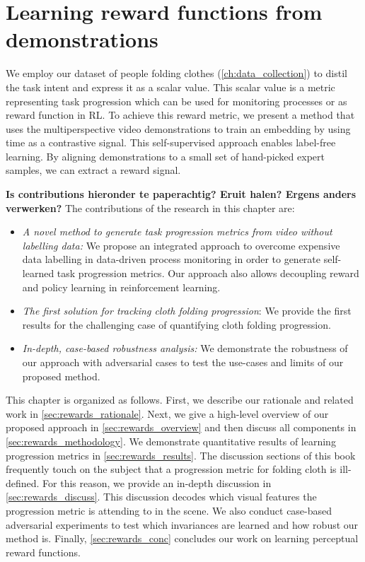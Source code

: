 \documentclass[\home/main.tex]{subfiles}
\begin{document}

\chapter{Learning reward functions from demonstrations}\label{ch:reward_functions}

We employ our dataset of people folding clothes (\cref{ch:data_collection}) to distil the task intent and express it as a scalar value. This scalar value is a metric representing task progression which can be used for monitoring processes or as reward function in \gls{RL}. To achieve this reward metric, we present a method that uses the multiperspective video demonstrations to train an embedding by using time as a contrastive signal. This self-supervised approach enables label-free learning. By aligning demonstrations to a small set of hand-picked expert samples, we can extract a reward signal.

\textbf{Is contributions hieronder te paperachtig? Eruit halen? Ergens anders verwerken?}
The contributions of the research in this chapter are:
\begin{itemize}
    \item \emph{A novel method to generate task progression metrics from video without labelling data:} We propose an integrated approach to overcome expensive data labelling in data-driven process monitoring in order to generate self-learned task progression metrics. Our approach also allows decoupling reward and policy learning in reinforcement learning.
    \item \emph{The first solution for tracking cloth folding progression}: We provide the first results for the challenging case of quantifying cloth folding progression.
    \item \emph{In-depth, case-based robustness analysis:} We demonstrate the robustness of our approach with adversarial cases to test the use-cases and limits of our proposed method.
\end{itemize}

This chapter is organized as follows.
First, we describe our rationale and related work in \cref{sec:rewards_rationale}. Next, we give a high-level overview of our proposed approach in \cref{sec:rewards_overview} and then discuss all components in \cref{sec:rewards_methodology}. We demonstrate quantitative results of learning progression metrics in \cref{sec:rewards_results}. The discussion sections of this book frequently touch on the subject that a progression metric for folding cloth is ill-defined. For this reason, we provide an in-depth discussion in \cref{sec:rewards_discuss}. This discussion decodes which visual features the progression metric is attending to in the scene. We also conduct case-based adversarial experiments to test which invariances are learned and how robust our method is. Finally, \cref{sec:rewards_conc} concludes our work on learning perceptual reward functions.
\end{document}
